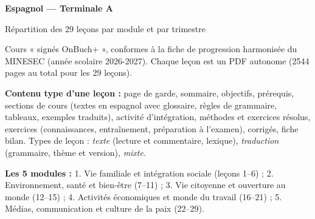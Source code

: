 \documentclass[11pt,a4paper]{article}
\begin{document}
{\LARGE\bfseries Espagnol — Terminale A\par}\smallskip
{\large Répartition des 29 leçons par module et par trimestre\par}\medskip
Cours « signés OnBuch+ », conformes à la fiche de progression harmonisée du MINESEC (année scolaire 2026-2027).
Chaque leçon est un PDF autonome (2544 pages au total pour les 29 leçons).\par\medskip
\textbf{Contenu type d'une leçon :} page de garde, sommaire, objectifs, prérequis, sections de cours (textes en espagnol avec glossaire,
règles de grammaire, tableaux, exemples traduits), activité d'intégration, méthodes et exercices résolus, exercices (connaissances, entraînement,
préparation à l'examen), corrigés, fiche bilan. Types de leçon : \emph{texte} (lecture et commentaire, lexique), \emph{traduction} (grammaire,
thème et version), \emph{mixte}.\par\medskip
\textbf{Les 5 modules :} 1. Vie familiale et intégration sociale (leçons 1--6) ; 2. Environnement, santé et bien-être (7--11) ;
3. Vie citoyenne et ouverture au monde (12--15) ; 4. Activités économiques et monde du travail (16--21) ;
5. Médias, communication et culture de la paix (22--29).\par\bigskip
\end{document}

